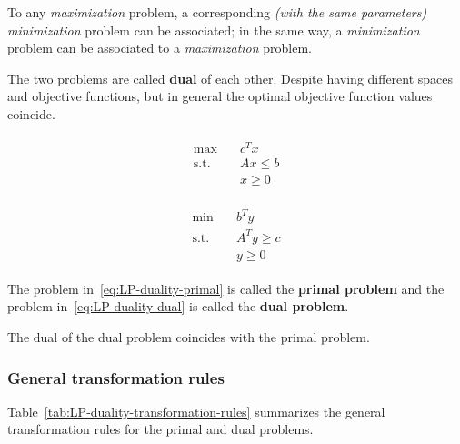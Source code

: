 \documentclass[english]{article}
\begin{document}
To any \textit{maximization} \LP problem, a corresponding \textit{(with the same parameters)} \textit{minimization} problem can be associated;
in the same way, a \textit{minimization} problem can be associated to a \textit{maximization} problem.

The two problems are called \textbf{dual} of each other.
Despite having different spaces and objective functions, but in general the optimal objective function values coincide.

\bigskip
\begin{minipage}{0.3\textwidth}
  \begin{gather}
    \begin{aligned}
      \max        & \quad c^T x     \\
      \text{s.t.} & \quad Ax \leq b \\
                  & \quad x \geq 0
    \end{aligned}
    \label{eq:LP-duality-primal}
  \end{gather}
\end{minipage}
\hspace{0.3\textwidth}
\begin{minipage}{0.3\textwidth}
  \begin{gather}
    \begin{aligned}
      \min        & \quad b^T y        \\
      \text{s.t.} & \quad A^T y \geq c \\
                  & \quad y \geq 0
    \end{aligned}
    \label{eq:LP-duality-dual}
  \end{gather}
\end{minipage}

\bigskip
\begin{definition}
  The problem in~\ref{eq:LP-duality-primal} is called the \textbf{primal problem} and the problem in~\ref{eq:LP-duality-dual} is called the \textbf{dual problem}.
\end{definition}

\begin{property}
  The dual of the dual problem coincides with the primal problem.
\end{property}

\subsubsection{General transformation rules}

Table~\ref{tab:LP-duality-transformation-rules} summarizes the general transformation rules for the primal and dual problems.
\end{document}
